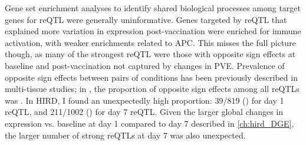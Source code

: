 Gene set enrichment analyses to identify shared biological processes among target genes for \gls{reQTL} were generally uninformative.
Genes targeted by \gls{reQTL} that explained more variation in expression post-vaccination were enriched for immune activation, with weaker enrichments related to \gls{APC}.
This misses the full picture though, as many of the strongest \gls{reQTL} were those with opposite sign effects at baseline and post-vaccination not captured by changes in \gls{PVE}.
Prevalence of opposite sign effects between pairs of conditions has been previously described in multi-tissue studies;
in \textcite{fu2012UnravelingRegulatoryMechanisms}, the proportion of opposite sign effects among all reQTLs was .
In \gls{HIRD}, I found an unexpectedly high proportion:
39/819 () for day 1 \gls{reQTL},
and 211/1002 () for day 7 \gls{reQTL}.
Given the larger global changes in expression vs. baseline at day 1 compared to day 7 described in \cref{ch:hird_DGE}, 
the larger number of strong \glspl{reQTL} at day 7 was also unexpected.

